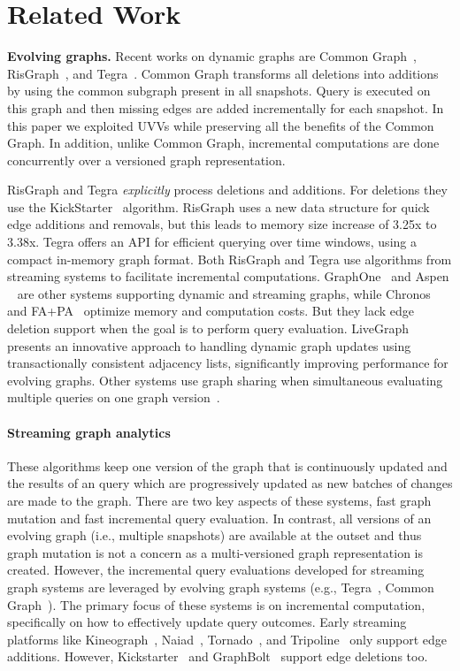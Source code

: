 \section{Related Work}
{\bf Evolving graphs.} Recent works on dynamic graphs are Common Graph~\cite{CommonGraph}, RisGraph~\cite{risgraph}, and Tegra~\cite{tegra}. Common Graph transforms all deletions into additions by using the common subgraph present in all snapshots. Query is executed on this graph and then  missing edges are added incrementally for each snapshot. In this paper we exploited UVVs while preserving all the benefits of the Common Graph. In addition, unlike Common Graph, incremental computations are done concurrently over a versioned graph representation.

RisGraph and Tegra \emph{explicitly} process deletions and additions. For deletions they use the KickStarter~\cite{kickstarter} algorithm. RisGraph uses a new data structure for quick edge additions and removals, but this leads to memory size increase of 3.25x to 3.38x. Tegra offers an API for efficient querying over time windows, using a compact in-memory graph format. Both RisGraph and Tegra use algorithms from streaming systems to facilitate incremental computations. GraphOne~\cite{GraphOne} and Aspen ~\cite{Aspen} are other systems supporting dynamic and streaming graphs, while Chronos~\cite{chronos} and FA+PA~\cite{evog-taco} optimize memory and computation costs. But they lack edge deletion support when the goal is to perform query evaluation. LiveGraph~\cite{LiveGraph} presents an innovative approach to handling dynamic graph updates using transactionally consistent adjacency lists, significantly improving performance for evolving graphs. Other systems use graph sharing when simultaneous evaluating multiple queries on one graph version~\cite{krill, glign, graphm}.

\vspace{-0.075in}
\paragraph*{Streaming graph analytics} These algorithms keep one version of the graph that is continuously updated and the results of an query which are progressively updated as new batches of changes are made to the graph. There are two key aspects of these systems, fast graph mutation and fast incremental query evaluation. In contrast, all versions of an evolving graph (i.e., multiple snapshots) are available at the outset and thus graph mutation is not a concern as a multi-versioned graph representation is created. However, the incremental query evaluations developed for streaming graph systems are leveraged by evolving graph systems (e.g., Tegra~\cite{tegra}, Common Graph~\cite{CommonGraph}).  The primary focus of these systems is on incremental computation, specifically on how to effectively update query outcomes. Early streaming platforms like Kineograph~\cite{kineograph}, Naiad~\cite{naiad}, Tornado~\cite{tornado}, and Tripoline~\cite{tripoline} only support edge additions. However, Kickstarter~\cite{kickstarter} and GraphBolt~\cite{graphbolt} support edge deletions too.